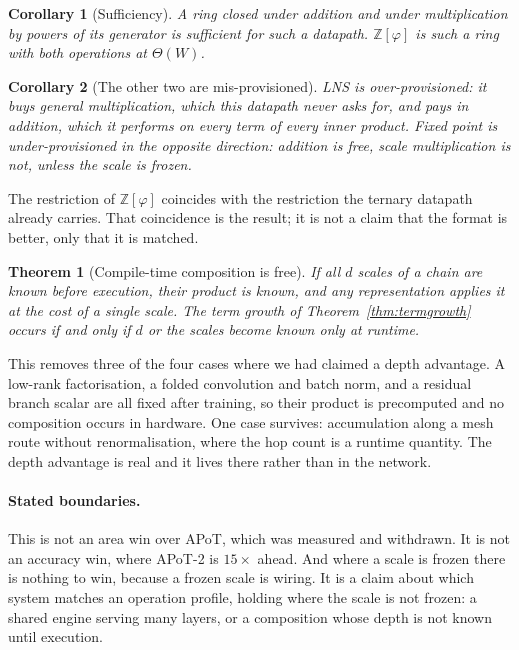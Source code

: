 \documentclass[11pt]{article}
\newtheorem{theorem}{Theorem}
\newtheorem{corollary}{Corollary}
\theoremstyle{definition}
\begin{document}
\begin{corollary}[Sufficiency]
\label{cor:sufficiency}
A ring closed under addition and under multiplication by powers of its generator
is sufficient for such a datapath. $\mathbb{Z}[\varphi]$ is such a ring with both
operations at $\Theta(W)$.
\end{corollary}

\begin{corollary}[The other two are mis-provisioned]
\label{cor:misprov}
LNS is over-provisioned: it buys general multiplication, which this datapath
never asks for, and pays in addition, which it performs on every term of every
inner product. Fixed point is under-provisioned in the opposite direction:
addition is free, scale multiplication is not, unless the scale is frozen.
\end{corollary}

The restriction of $\mathbb{Z}[\varphi]$ coincides with the restriction the
ternary datapath already carries. That coincidence is the result; it is not a
claim that the format is better, only that it is matched.

\begin{theorem}[Compile-time composition is free]
\label{thm:compilecomp}
If all $d$ scales of a chain are known before execution, their product is known,
and any representation applies it at the cost of a single scale. The term growth
of Theorem~\ref{thm:termgrowth} occurs if and only if $d$ or the scales become
known only at runtime.
\end{theorem}

This removes three of the four cases where we had claimed a depth advantage. A
low-rank factorisation, a folded convolution and batch norm, and a residual
branch scalar are all fixed after training, so their product is precomputed and
no composition occurs in hardware. One case survives: accumulation along a mesh
route without renormalisation, where the hop count is a runtime quantity. The
depth advantage is real and it lives there rather than in the network.

\paragraph{Stated boundaries.} This is not an area win over APoT, which was
measured and withdrawn. It is not an accuracy win, where APoT-2 is $15\times$
ahead. And where a scale is frozen there is nothing to win, because a frozen
scale is wiring. It is a claim about which system matches an operation profile,
holding where the scale is not frozen: a shared engine serving many layers, or a
composition whose depth is not known until execution.
\end{document}
